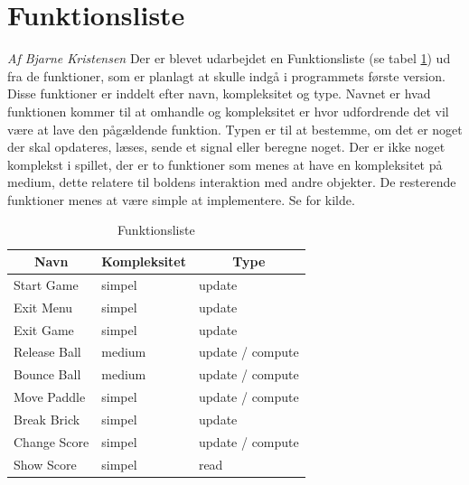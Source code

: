 \section{Funktionsliste}
\textit{Af Bjarne Kristensen}\newline
Der er blevet udarbejdet en Funktionsliste (se  tabel \ref{Funktionsliste}) ud fra de funktioner, som er  planlagt at skulle indgå i programmets første version. Disse funktioner er inddelt efter navn, kompleksitet og type. Navnet er hvad funktionen kommer til at omhandle og kompleksitet er hvor udfordrende det vil være at lave den pågældende funktion. Typen er til at bestemme, om det er noget der skal opdateres, læses, sende et signal eller beregne noget. Der er ikke noget komplekst i spillet, der er to funktioner som menes at have en kompleksitet på medium, dette relatere til boldens interaktion med andre objekter. De resterende funktioner menes at være simple at implementere.\newline
\newline
Se \cite[chap. 7.3, fig. 7.6]{Mathiassen200006} for kilde.

\begin{table}[]
\centering
\caption{Funktionsliste}
\label{Funktionsliste}
\begin{tabular}{|l|l|l|}
\hline
\multicolumn{1}{|c|}{Navn} & \multicolumn{1}{c|}{Kompleksitet} & \multicolumn{1}{c|}{Type} \\ \hline
Start Game & simpel & update \\ \hline
Exit Menu & simpel & update \\ \hline
Exit Game & simpel & update \\ \hline
Release Ball & medium & update / compute \\ \hline
Bounce Ball & medium & update / compute \\ \hline
Move Paddle & simpel & update / compute \\ \hline
Break Brick & simpel & update \\ \hline
Change Score & simpel & update / compute \\ \hline
Show Score & simpel & read \\ \hline
\end{tabular}
\end{table}

